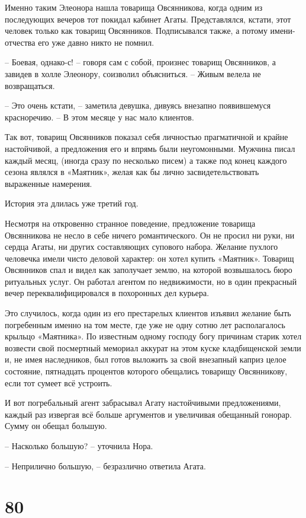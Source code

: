 \documentclass[
  a5paperpaper,
  DIV=11,
  numbers=noendperiod]{scrreprt}
\begin{document}
Именно таким Элеонора нашла товарища Овсянникова, когда одним из
последующих вечеров тот покидал кабинет Агаты. Представлялся, кстати,
этот человек только как товарищ Овсянников. Подписывался также, а потому
имени-отчества его уже давно никто не помнил.

-- Боевая, однако-с! -- говоря сам с собой, произнес товарищ Овсянников,
а завидев в холле Элеонору, соизволил объясниться. -- Живым велела не
возвращаться.

-- Это очень кстати, -- заметила девушка, дивуясь внезапно появившемуся
красноречию. -- В этом месяце у нас мало клиентов.

Так вот, товарищ Овсянников показал себя личностью прагматичной и крайне
настойчивой, а предложения его и впрямь были неугомонными. Мужчина писал
каждый месяц, (иногда сразу по несколько писем) а также под конец
каждого сезона являлся в «Маятник», желая как бы лично
засвидетельствовать выраженные намерения.

История эта длилась уже третий год.

Несмотря на откровенно странное поведение, предложение товарища
Овсянникова не несло в себе ничего романтического. Он не просил ни руки,
ни сердца Агаты, ни других составляющих супового набора. Желание пухлого
человечка имели чисто деловой характер: он хотел купить «Маятник».
Товарищ Овсянников спал и видел как заполучает землю, на которой
возвышалось бюро ритуальных услуг. Он работал агентом по недвижимости,
но в один прекрасный вечер переквалифицировался в похоронных дел
курьера.

Это случилось, когда один из его престарелых клиентов изъявил желание
быть погребенным именно на том месте, где уже не одну сотню лет
располагалось крыльцо «Маятника». По известным одному господу богу
причинам старик хотел возвести свой посмертный мемориал аккурат на этом
куске кладбищенской земли и, не имея наследников, был готов выложить за
свой внезапный каприз целое состояние, пятнадцать процентов которого
обещались товарищу Овсянникову, если тот сумеет всё устроить.

И вот погребальный агент забрасывал Агату настойчивыми предложениями,
каждый раз извергая всё больше аргументов и увеличивая обещанный
гонорар. Сумму он обещал большую.

-- Насколько большую? -- уточнила Нора.

-- Неприлично большую, -- безразлично ответила Агата.

\section*{80}\label{80}
\end{document}
